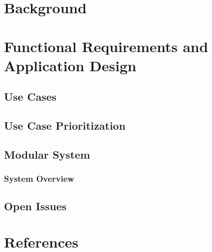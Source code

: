 \documentclass[a4paper,12pt]{article}
\begin{document}
	\section{Background}	
	
	
	
	\section{Functional Requirements and Application Design}
	
	
		\subsection{Use Cases}
		
		
		\subsection{Use Case Prioritization}
		
		
		\subsection{Modular System}
		
			\subsubsection{System Overview}
			
			
		
	
		\subsection{Open Issues}
		
	
	
	\section{References}
	
	
	
\end{document}
